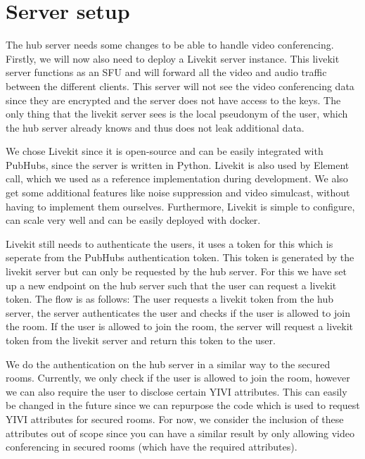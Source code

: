 \documentclass{report}
\begin{document}
\section{Server setup}
The hub server needs some changes to be able to handle video conferencing. Firstly, we will now also need to deploy a
Livekit server instance. This livekit server functions as an SFU and will forward all the video and audio traffic
between the different clients. This server will not see the video conferencing data since they are
encrypted and the server does not have access to the keys. The only thing that the livekit server sees is the local
pseudonym of the user, which the hub server already knows and thus does not leak additional data.

We chose Livekit since it is open-source and can be easily integrated with PubHubs, since the server is written in
Python. Livekit is also used by Element call, which we used as a reference implementation during development. We
also get some additional features like noise suppression and video simulcast, without having to implement them
ourselves. Furthermore, Livekit is simple to configure, can scale very well and can be easily deployed with docker.

Livekit still needs to authenticate the users, it uses a token for this which is seperate from the PubHubs
authentication token. This token is generated by the livekit server but can only be requested by the hub server.
For this we have set up a new endpoint on the hub server such that the user can request a livekit token. The flow is
as follows: The user requests a livekit token from the hub server, the server authenticates the user and checks if
the user is allowed to join the room. If the user is allowed to join the room, the server will request a livekit
token from the livekit server and return this token to the user.

We do the authentication on the hub server in a similar way to the secured rooms. Currently, we only check if
the user is allowed to join the room, however we can also require the user to disclose
certain YIVI attributes. This can easily be changed in the future since we can repurpose the code which is used to
request YIVI attributes for secured rooms. For now, we consider the inclusion of these attributes out of scope since
you can have a similar result by only allowing video conferencing in secured rooms (which have the required
attributes).
\end{document}
